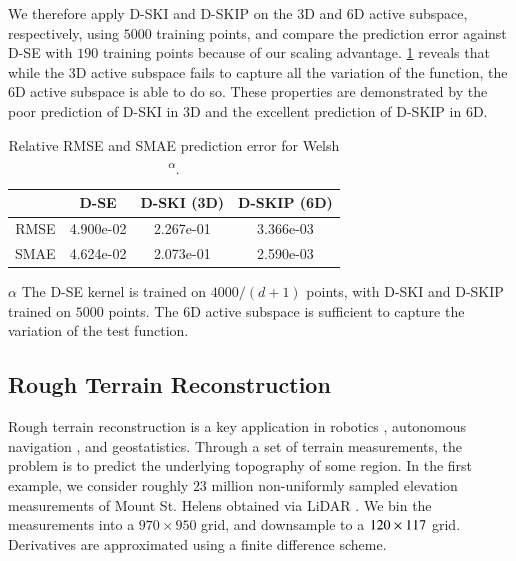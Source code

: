 We therefore apply D\hyp{}SKI and D\hyp{}SKIP on the 3D and 6D active subspace,
respectively, using $5000$ training points, and compare the prediction error
against D\hyp{}SE with $190$ training points because of our scaling advantage. 
\cref{tab:dim_red} reveals that while the 3D active subspace fails to capture
all the variation of the function, the 6D active subspace is able to do so.
These properties are demonstrated by the poor prediction of D\hyp{}SKI in 3D and
the excellent prediction of D\hyp{}SKIP in 6D. 

\begin{table}[ht]
  \centering
  \caption{Relative RMSE and SMAE prediction error for Welsh
  \textsuperscript{$\alpha$}.}\label{tab:dim_red}
  \begin{threeparttable}
    \begin{tabular}{r c c c}
      \toprule
      & D-SE & D-SKI (3D) & D-SKIP (6D) \\ \midrule
      RMSE & 4.900e-02 & 2.267e-01 & 3.366e-03 \\
      SMAE & 4.624e-02 & 2.073e-01 & 2.590e-03 \\
      \bottomrule
    \end{tabular}
    \begin{tablenotes}
      \item[$\alpha$]The D\hyp{}SE kernel is trained on $4000/(d+1)$ points,
      with D\hyp{}SKI and D\hyp{}SKIP trained on $5000$ points. The 6D active
      subspace is sufficient to capture the variation of the test function.
    \end{tablenotes}
  \end{threeparttable}
\end{table}

\subsection{Rough Terrain Reconstruction}

Rough terrain reconstruction is a key application in robotics 
\cite{gingras2010rough, konolige2010large}, autonomous navigation 
\cite{hadsell2010accurate}, and geostatistics. Through a set of terrain
measurements, the problem is to predict the underlying topography of some
region. In the first example, we consider roughly $23$ million 
non\hyp{}uniformly sampled elevation measurements of Mount St. Helens obtained
via LiDAR \cite{sthelen2002lidar}. We bin the measurements into a $970\times
950$ grid, and downsample to a $120\mathbin{\times} 117$ grid. Derivatives are
approximated using a finite difference scheme.

